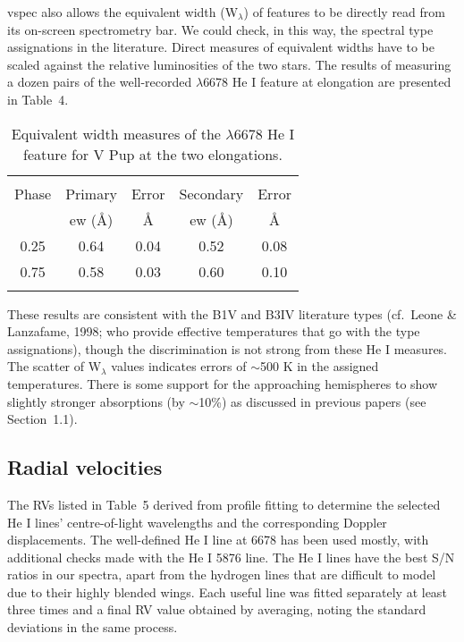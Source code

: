 \documentclass[useAMS,usenatbib]{mnras}                                                                           \usepackage[pdftex]{graphicx}
\begin{document}
{\sc vspec} also allows the equivalent width (W$_\lambda$) of features
to be directly read from  its on-screen spectrometry bar.
We could check, in this way, the spectral type assignations
in the literature.  Direct measures of equivalent widths
have to be scaled against the relative luminosities of the two stars.
The results of measuring a dozen pairs of the well-recorded 
$\lambda$6678 He I feature at elongation are presented in Table~4.

\begin{table}
\begin{center}
\caption{Equivalent width measures of the $\lambda$6678 He I feature
for V Pup at the two elongations.
\label{tbl-4}}
\begin{tabular}{ccccc}
  & & & & \\
\multicolumn{1}{c}{Phase}  & \multicolumn{1}{c}{ Primary} &
\multicolumn{1}{l}{Error} & \multicolumn{1}{l}{Secondary} & \multicolumn{1}{l}{Error} \\
\multicolumn{1}{c}{}  & \multicolumn{1}{c}{ ew (\AA)} &
\multicolumn{1}{c}{\AA} & \multicolumn{1}{c}{ew (\AA)} & \multicolumn{1}{c}{\AA} \\
0.25  &0.64&	0.04&	0.52&	0.08 \\
0.75  &0.58&	0.03&	0.60& 	0.10 \\
\hline \\
\end{tabular}
\end{center}
\end{table}
These results are consistent with the B1V and B3IV literature types (cf.\ Leone \& Lanzafame, 1998;
who provide effective
  temperatures that go with the type assignations),
though the discrimination is not strong  from these He I measures.
  The scatter of W$_\lambda$ values indicates errors  of $\sim$500 K
  in the assigned temperatures.
There is some support for the approaching hemispheres to  show slightly 
stronger absorptions (by $\sim$10\%) as discussed in previous
papers (see Section~1.1).
 
\subsection{Radial velocities}

The RVs listed in Table~5  derived from profile fitting to  
determine the selected He I lines' centre-of-light wavelengths and
the corresponding Doppler displacements.
The well-defined He I line at 6678 has been used mostly,
with additional checks made with the He I 5876 line. 
The He I lines have the best S/N ratios in our spectra, apart from 
the hydrogen lines that are difficult to model due to their highly blended wings.  
Each useful line was fitted separately at least three times and a final RV value obtained by averaging, noting the standard deviations in the same process.   
\end{document}
